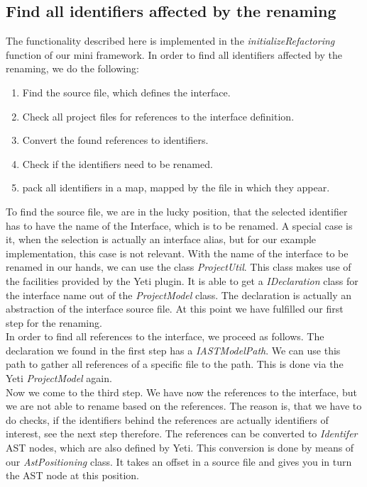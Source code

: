 \documentclass[a4paper,10pt]{report}
\begin{document}
\subsection{Find all identifiers affected by the renaming}
The functionality described here is implemented in the {\it initializeRefactoring} function of our mini framework.
In order to find all identifiers affected by the renaming, we do the following:
   \begin{enumerate}
     \item Find the source file, which defines the interface.
     \item Check all project files for references to the interface definition.
     \item Convert the found references to identifiers.
     \item Check if the identifiers need to be renamed.
     \item pack all identifiers in a map, mapped by the file in which they appear.
   \end{enumerate}
To find the source file, we are in the lucky position, that the selected identifier has to have the name of the Interface, which is to be renamed. 
A special case is it, when the selection is actually an interface alias, but for our example implementation, this case is not relevant. 
With the name of the interface to be renamed in our hands, we can use the class {\it ProjectUtil}. This class makes use of the facilities provided by the Yeti plugin.
It is able to get a {\it IDeclaration} class for the interface name out of the {\it ProjectModel} class. The declaration is actually an abstraction of the interface source file. 
At this point we have fulfilled our first step for the renaming.\\
In order to find all references to the interface, we proceed as follows. The declaration we found in the first step has a {\it IASTModelPath}. 
We can use this path to gather all references of a specific file to the path. This is done via the Yeti {\it ProjectModel} again.\\
Now we come to the third step. We have now the references to the interface, but we are not able to rename based on the references.
The reason is, that we have to do checks, if the identifiers behind the references are actually identifiers of interest, see the next step therefore.
The references can be converted to {\it Identifer} AST nodes, which are also defined by Yeti. This conversion is done by means of our {\it AstPositioning} class.
It takes an offset in a source file and gives you in turn the AST node at this position. 
\end{document}
